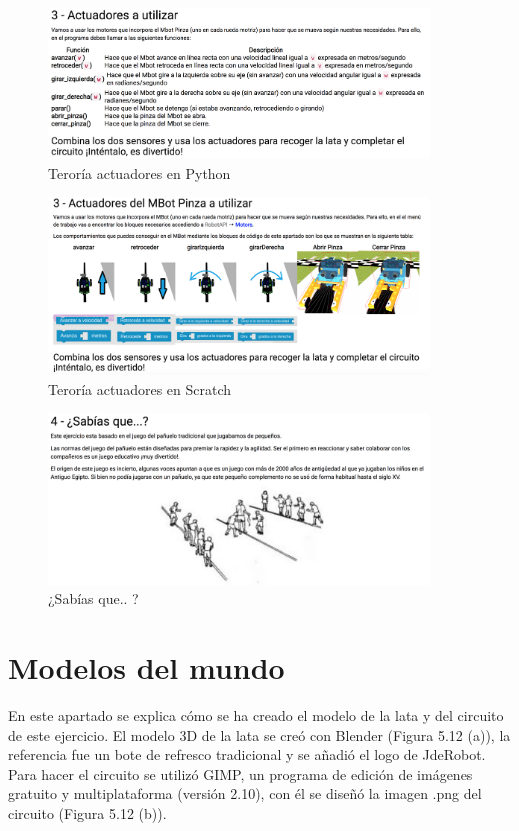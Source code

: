 \begin{figure}[H]
    \centering
    \includegraphics[width=0.9\textwidth, height=0.4\textwidth]{chapters/images/teoriag51python.png}
    \caption{Teroría actuadores en Python}
    \label{fig:my_label}
\end{figure}
\begin{figure}[H]
    \centering
    \includegraphics[width=0.9\textwidth, height=0.4\textwidth]{chapters/images/teoriag51scratch.png}
    \caption{Teroría  actuadores en Scratch}
    \label{fig:my_label}
\end{figure}
\begin{figure}[H]
    \centering
    \includegraphics[width=0.9\textwidth, height=0.4\textwidth]{chapters/images/teoriag5.png}
    \caption{¿Sabías que.. ?}
    \label{fig:my_label}
\end{figure}

\section{Modelos del mundo}
En este apartado se explica cómo se ha creado el modelo de la lata y del circuito de este ejercicio.
El modelo 3D de la lata se creó con Blender (Figura 5.12 (a)), la referencia fue un bote de refresco tradicional y se añadió el logo de JdeRobot. Para hacer el circuito  se utilizó  GIMP, un programa de edición de imágenes gratuito y multiplataforma (versión 2.10), con él se diseñó la imagen .png del circuito (Figura 5.12 (b)).
 
